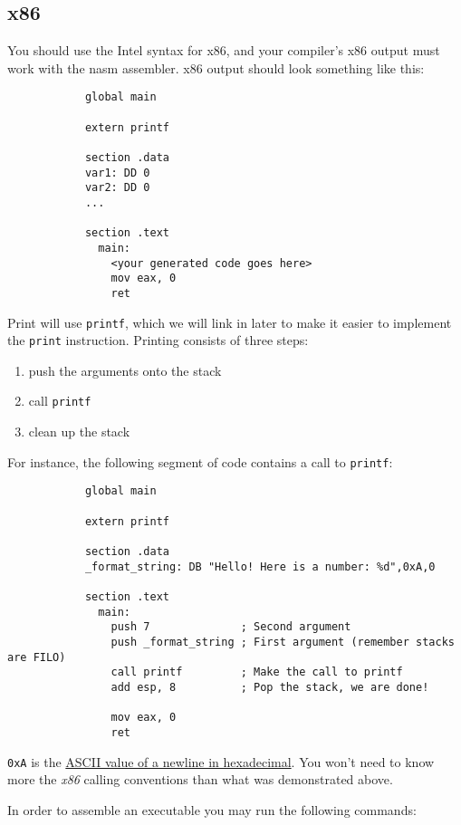 \documentclass{article}
\newcommand{\code}[1]{\texttt{\textmd{#1}}}
\begin{document}
	
	\subsection{x86}
	
		You should use the Intel syntax for x86, and your compiler's x86 output must work with the nasm assembler.
		x86 output should look something like this:
		
		\begin{lstlisting}
			global main
			
			extern printf
			
			section .data
			var1: DD 0
			var2: DD 0
			...
			
			section .text
			  main:
			    <your generated code goes here>
			    mov eax, 0
			    ret
		\end{lstlisting}
		
		Print will use \code{printf}, which we will link in later to make it easier to implement the \code{print}
		instruction. Printing consists of three steps:

		\begin{enumerate}
			\item push the arguments onto the stack
			\item call \code{printf}
			\item clean up the stack
		\end{enumerate}

		For instance, the following segment of code contains a call to \code{printf}:

		\begin{lstlisting}
			global main
			
			extern printf
			
			section .data
			_format_string: DB "Hello! Here is a number: %d",0xA,0
			
			section .text
			  main:
			    push 7              ; Second argument
			    push _format_string ; First argument (remember stacks are FILO)
			    call printf         ; Make the call to printf
			    add esp, 8          ; Pop the stack, we are done!
			
			    mov eax, 0
			    ret
		\end{lstlisting}
		
		\texttt{0xA} is the \href{http://www.asciitable.com/}{ASCII value of a newline in hexadecimal}. You won't need
		to know more the \textit{x86} calling conventions than what was demonstrated above.
		
		In order to assemble an executable you may run the following commands:
		
\end{document}
